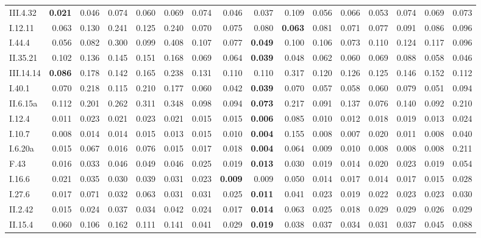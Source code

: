 \begin{table}[!htbp]
\begin{tabular}{lrrrrrrrrrrrrrrr}
III.4.32 & \textbf{0.021} & 0.046 & 0.074 & 0.060 & 0.069 & 0.074 & 0.046 & 0.037 & 0.109 & 0.056 & 0.066 & 0.053 & 0.074 & 0.069 & 0.073 \\
I.12.11 & 0.063 & 0.130 & 0.241 & 0.125 & 0.240 & 0.070 & 0.075 & 0.080 & \textbf{0.063} & 0.081 & 0.071 & 0.077 & 0.091 & 0.086 & 0.096 \\
I.44.4 & 0.056 & 0.082 & 0.300 & 0.099 & 0.408 & 0.107 & 0.077 & \textbf{0.049} & 0.100 & 0.106 & 0.073 & 0.110 & 0.124 & 0.117 & 0.096 \\
II.35.21 & 0.102 & 0.136 & 0.145 & 0.151 & 0.168 & 0.069 & 0.064 & \textbf{0.039} & 0.048 & 0.062 & 0.060 & 0.069 & 0.088 & 0.058 & 0.046 \\
III.14.14 & \textbf{0.086} & 0.178 & 0.142 & 0.165 & 0.238 & 0.131 & 0.110 & 0.110 & 0.317 & 0.120 & 0.126 & 0.125 & 0.146 & 0.152 & 0.112 \\
I.40.1 & 0.070 & 0.218 & 0.115 & 0.210 & 0.177 & 0.060 & 0.042 & \textbf{0.039} & 0.070 & 0.057 & 0.058 & 0.060 & 0.079 & 0.051 & 0.094 \\
II.6.15a & 0.112 & 0.201 & 0.262 & 0.311 & 0.348 & 0.098 & 0.094 & \textbf{0.073} & 0.217 & 0.091 & 0.137 & 0.076 & 0.140 & 0.092 & 0.210 \\
I.12.4 & 0.011 & 0.023 & 0.021 & 0.023 & 0.021 & 0.015 & 0.015 & \textbf{0.006} & 0.085 & 0.010 & 0.012 & 0.018 & 0.019 & 0.013 & 0.024 \\
I.10.7 & 0.008 & 0.014 & 0.014 & 0.015 & 0.013 & 0.015 & 0.010 & \textbf{0.004} & 0.155 & 0.008 & 0.007 & 0.020 & 0.011 & 0.008 & 0.040 \\
I.6.20a & 0.015 & 0.067 & 0.016 & 0.076 & 0.015 & 0.017 & 0.018 & \textbf{0.004} & 0.064 & 0.009 & 0.010 & 0.008 & 0.008 & 0.008 & 0.211 \\
F.43 & 0.016 & 0.033 & 0.046 & 0.049 & 0.046 & 0.025 & 0.019 & \textbf{0.013} & 0.030 & 0.019 & 0.014 & 0.020 & 0.023 & 0.019 & 0.054 \\
I.16.6 & 0.021 & 0.035 & 0.030 & 0.039 & 0.031 & 0.023 & \textbf{0.009} & 0.009 & 0.050 & 0.014 & 0.017 & 0.014 & 0.017 & 0.015 & 0.028 \\
I.27.6 & 0.017 & 0.071 & 0.032 & 0.063 & 0.031 & 0.031 & 0.025 & \textbf{0.011} & 0.041 & 0.023 & 0.019 & 0.022 & 0.023 & 0.023 & 0.030 \\
II.2.42 & 0.015 & 0.024 & 0.037 & 0.034 & 0.042 & 0.024 & 0.017 & \textbf{0.014} & 0.063 & 0.025 & 0.018 & 0.029 & 0.029 & 0.026 & 0.029 \\
II.15.4 & 0.060 & 0.106 & 0.162 & 0.111 & 0.141 & 0.041 & 0.029 & \textbf{0.019} & 0.038 & 0.037 & 0.034 & 0.031 & 0.037 & 0.045 & 0.088 \\

\end{tabular}
\end{table}
